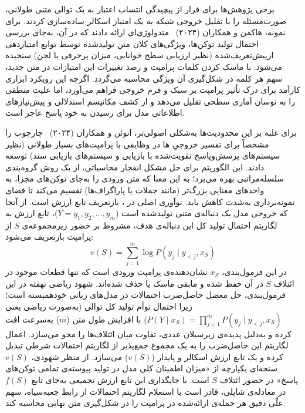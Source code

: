 برخی پژوهش‌ها برای فرار از پیچیدگی انتساب اعتبار به یک توالی متنی طولانی، صورت‌مسئله را با تقلیل خروجی شبکه به یک امتیاز اسکالر ساده‌سازی کردند. برای نمونه، هاکمن و همکاران (۲۰۲۴)~\cite{hackmann2024wordimportance} متدولوژی‌ای ارائه دادند که در آن، به‌جای بررسی احتمال تولید توکن‌ها، ویژگی‌های کلان متن تولیدشده توسط توابع امتیازدهی ازپیش‌تعریف‌شده (نظیر ارزیابی سطح خوانایی، میزان پرحرفی یا لحن) سنجیده می‌شود. با ماسک کردن کلمات پرامپت و رصد تغییرات این امتیازات در متن جدید، سهم هر کلمه در شکل‌گیری آن ویژگی محاسبه می‌گردد. اگرچه این رویکرد ابزاری کارآمد برای درک تأثیر پرامپت بر سبک و فرم خروجی فراهم می‌آورد، اما علیت منطقی را به نوسان آماری سطحی تقلیل می‌دهد و از کشف مکانیسم استدلالی و پیش‌نیازهای اطلاعاتی مدل برای رسیدن به خود پاسخ عاجز است.

برای غلبه بر این محدودیت‌ها به‌شکلی اصولی‌تر، انوئن و همکاران (۲۰۲۴)~\cite{enouen2024textgenshap} چارچوب  را مشخصاً برای تفسیر خروجیِ ها در وظایفی با پرامپت‌های بسیار طولانی (نظیر سیستم‌های پرسش‌وپاسخ تقویت‌شده با بازیابی و سیستم‌های بازیابی سند) توسعه دادند. این الگوریتم برای حل مشکل انفجار محاسباتی، از یک روش گروه‌بندی سلسله‌مراتبی بهره می‌برد؛ به این معنا که متن ورودی را به‌جای توکن‌های مجزا، به واحدهای معنایی بزرگ‌تر (مانند جملات یا پاراگراف‌ها) تقسیم می‌کند تا فضای نمونه‌برداری به‌شدت کاهش یابد. نوآوری اصلی در ، بازتعریف تابع ارزش است. از آنجا که خروجی مدل یک دنباله‌ی متنی تولیدشده است ($Y = y_1, y_2, \dots, y_m$)، تابع ارزش به لگاریتم احتمال تولید کل این دنباله‌ی هدف، مشروط بر حضور زیرمجموعه‌ی $S$ از پرامپت بازتعریف می‌شود:
\begin{equation}\label{eq:chap3_textgenshap}
    v(S) = \sum_{j=1}^{m} \log P(y_j \mid y_{<j}, x_S)
\end{equation}
در این فرمول‌بندی، $x_S$ نشان‌دهنده‌ی پرامپت ورودی است که تنها قطعات موجود در ائتلاف $S$ در آن حفظ شده و مابقی ماسک یا حذف شده‌اند.
شهود ریاضی نهفته در این فرمول‌بندی، حل معضل حاصل‌ضرب احتمالات در مدل‌های زبانی خودهمبسته است؛ زیرا احتمال توأم تولید کل توالی (به‌صورت ریاضی یعنی $P(Y \mid x_S) = \prod_{j=1}^m P(y_j \mid y_{<j}, x_S)$) با افزایش طول متن ($m$) به‌سرعت افت کرده و به‌دلیل پدیده‌ی زیرسیلان عددی، تفاوت میان ائتلاف‌ها را محو می‌سازد. اعمال لگاریتم این حاصل‌ضرب را به یک مجموع جمع‌پذیر از لگاریتم احتمالات شرطی تبدیل کرده و یک تابع ارزش اسکالر و پایدار ($v(S)$) می‌سازد. از منظر شهودی، $v(S)$ سنجه‌ای یکپارچه از «میزان اطمینان کلی مدل در تولید پیوسته‌ی تمامی توکن‌های پاسخ» در حضور ائتلاف $S$ است. با جایگذاری این تابع ارزش تجمیعی به‌جای تابع $f(S)$ در معادله‌ی شاپلی،  قادر است با استعلام لگاریتم احتمالات از رابط جعبه‌سیاه، سهم علّی دقیق هر جمله‌ی ارائه‌شده در پرامپت را در شکل‌گیری متن نهایی محاسبه کند.

